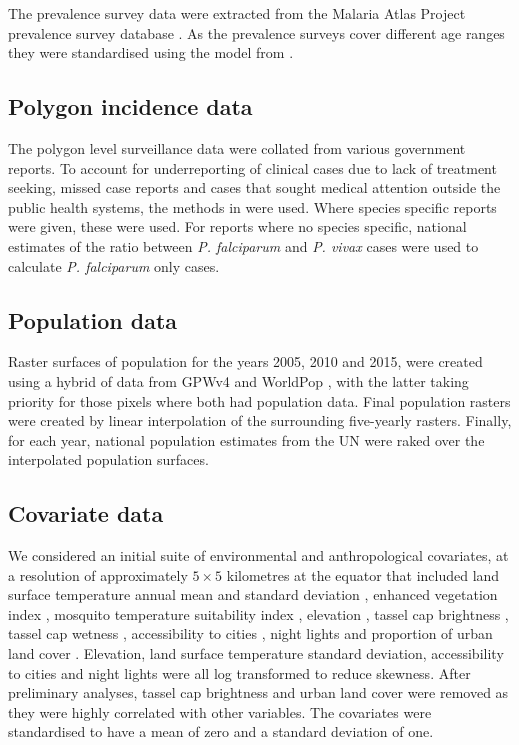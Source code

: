 \documentclass[10pt,letterpaper]{article}
\begin{document}
The prevalence survey data were extracted from the Malaria Atlas Project prevalence survey database \cite{bhatt2015effect}.
As the prevalence surveys cover different age ranges they were standardised using the model from \cite{smith2007standardizing}.


\subsection*{Polygon incidence data}

The polygon level surveillance data were collated from various government reports.
To account for underreporting of clinical cases due to lack of treatment seeking, missed case reports and cases that sought medical attention outside the public health systems, the methods in \cite{cibulskis2011worldwide} were used.
Where species specific reports were given, these were used. 
For reports where no species specific, national estimates of the ratio between \emph{P. falciparum} and \emph{P. vivax} cases were used to calculate \emph{P. falciparum} only cases.



\subsection*{Population data}

Raster surfaces of population for the years 2005, 2010 and 2015, were created using a hybrid of data from GPWv4 \cite{gpw4} and WorldPop \cite{tatem2017worldpop}, with the latter taking priority for those pixels where both had population data. 
Final population rasters were created by linear interpolation of the surrounding five-yearly rasters.
Finally, for each year, national population estimates from the UN were raked over the interpolated population surfaces. 

\subsection*{Covariate data}

We considered an initial suite of environmental and anthropological covariates, at a resolution of approximately $5 \times 5$ kilometres at the equator that included land surface temperature annual mean and standard deviation \cite{LST}, enhanced vegetation index \cite{TCB}, mosquito temperature suitability index \cite{weiss2014air}, elevation \cite{SRTMElev}, tassel cap brightness \cite{TCB}, tassel cap wetness \cite{TCB}, accessibility to cities \cite{weiss2018global}, night lights \cite{} and proportion of urban land cover \cite{}.
Elevation, land surface temperature standard deviation, accessibility to cities and night lights were all log transformed to reduce skewness.
After preliminary analyses, tassel cap brightness and urban land cover were removed as they were highly correlated with other variables.
The covariates were standardised to have a mean of zero and a standard deviation of one.
\end{document}
